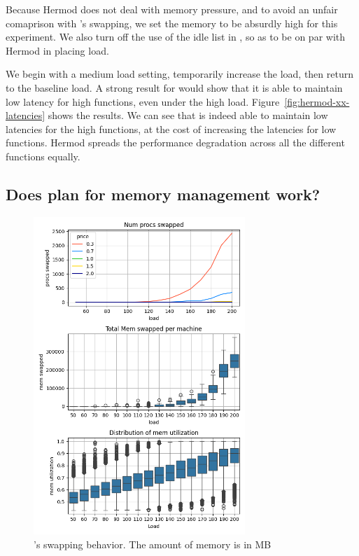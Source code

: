 Because Hermod does not deal with memory pressure, and to avoid an unfair
comaprison with \sys{}'s swapping, we set the memory to be absurdly high for
this experiment. We also turn off the use of the idle list in \sys{}, so as to
be on par with Hermod in placing load.

We begin with a medium load setting, temporarily increase the load, then return
to the baseline load. A strong result for \sys{} would show that it is able to
maintain low latency for high \priceclass{} functions, even under the high load.
Figure~\ref{fig:hermod-xx-latencies} shows the results. We can see that \sys{}
is indeed able to maintain low latencies for the high \class{} functions, at the
cost of increasing the latencies for low \class{} functions. Hermod spreads the
performance degradation across all the different functions equally.


\subsection{Does \sys{} plan for memory management work?}

\begin{figure}[t!]
    \centering
      \includegraphics[width=8cm]{img/memory_graphs.png}
      \caption{ \sys{}'s swapping behavior. The amount of memory is in MB  }
    \label{fig:memory-graphs}
\end{figure}

